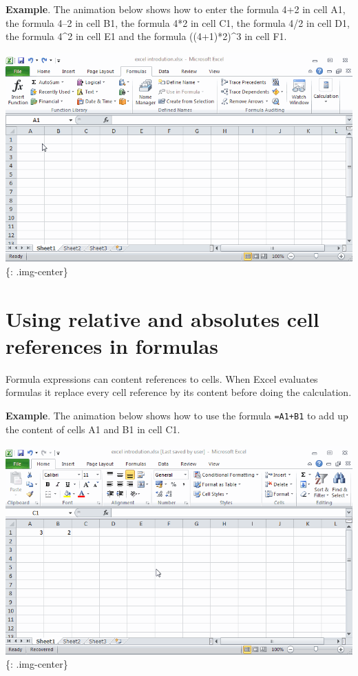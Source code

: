 \textbf{Example}. The animation below shows how to enter the formula 4+2 in cell A1, the formula 4--2 in cell B1, the formula 4*2 in cell C1, the formula 4\slash 2 in cell D1, the formula 4\^{}2 in cell E1 and the formula ((4+1)*2)\^{}3 in cell F1.

\includegraphics[keepaspectratio,width=\textwidth,height=0.75\textheight]{img/example_enter_formulas.gif}
\{: .img-center\}

\chapter{Using relative and absolutes cell references in formulas}
\label{usingrelativeandabsolutescellreferencesinformulas}

Formula expressions can content references to cells. When Excel evaluates formulas it replace every cell reference by its content before doing the calculation.

\textbf{Example}. The animation below shows how to use the formula \texttt{=A1+B1} to add up the content of cells A1 and B1 in cell C1.

\includegraphics[keepaspectratio,width=\textwidth,height=0.75\textheight]{img/example_formulas_with_references.gif}
\{: .img-center\}

